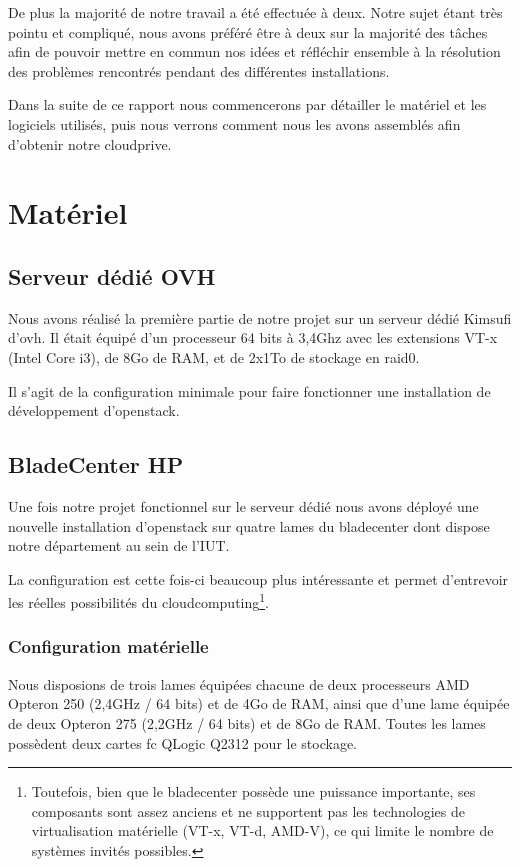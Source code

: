 \documentclass[a4paper,oneside]{report}
\begin{document}
De plus la majorité de notre travail a été effectuée à deux.
Notre sujet étant très pointu et compliqué, nous avons préféré être à deux sur la majorité des tâches afin de pouvoir mettre en commun nos idées et réfléchir ensemble à la résolution des problèmes rencontrés pendant des différentes installations.

Dans la suite de ce rapport nous commencerons par détailler le matériel et les logiciels utilisés, puis nous verrons comment nous les avons assemblés afin d'obtenir notre \gls{cloudprive}.

\chapter{Matériel}

\section{Serveur dédié OVH}
Nous avons réalisé la première partie de notre projet sur un serveur dédié Kimsufi d'\gls{ovh}.
Il était équipé d'un processeur 64 bits à 3,4Ghz avec les extensions VT-x (Intel Core i3), de 8Go de RAM, et de 2x1To de stockage en \gls{raid0}.

Il s'agit de la configuration minimale pour faire fonctionner une installation de développement d'\gls{openstack}.

\section{BladeCenter HP}
Une fois notre projet fonctionnel sur le serveur dédié nous avons déployé une nouvelle installation d'\gls{openstack} sur quatre lames du \gls{bladecenter} dont dispose notre département au sein de l'IUT.

La configuration est cette fois-ci beaucoup plus intéressante et permet d'entrevoir les réelles possibilités du \gls{cloudcomputing}\footnote{Toutefois, bien que le \gls{bladecenter} possède une puissance importante, ses composants sont assez anciens et ne supportent pas les technologies de \gls{virtualisation} matérielle (VT-x, VT-d, AMD-V), ce qui limite le nombre de systèmes invités possibles.}.

\subsection{Configuration matérielle}
Nous disposions de trois lames équipées chacune de deux processeurs AMD Opteron 250 (2,4GHz / 64 bits) et de 4Go de RAM, ainsi que d'une lame équipée de deux Opteron 275 (2,2GHz / 64 bits) et de 8Go de RAM.\newline
Toutes les lames possèdent deux cartes \gls{fc} QLogic Q2312 pour le stockage.
\end{document}
